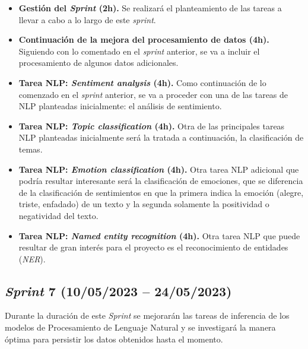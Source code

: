 \begin{itemize}

    \item \textbf{Gestión del \textit{Sprint} (2h).} Se realizará el planteamiento de las tareas a llevar a cabo a lo largo de este \textit{sprint}.

    \item \textbf{Continuación de la mejora del procesamiento de datos (4h).} Siguiendo con lo comentado en el \textit{sprint} anterior, se va a incluir el procesamiento de algunos datos adicionales.

    \item \textbf{Tarea NLP: \textit{Sentiment analysis} (4h).} Como continuación de lo comenzado en el \textit{sprint} anterior, se va a proceder con una de las tareas de NLP planteadas inicialmente: el análisis de sentimiento.

    \item \textbf{Tarea NLP: \textit{Topic classification} (4h).} Otra de las principales tareas NLP planteadas inicialmente será la tratada a continuación, la clasificación de temas.

    \item \textbf{Tarea NLP: \textit{Emotion classification} (4h).} Otra tarea NLP adicional que podría resultar interesante será la clasificación de emociones, que se diferencia de la clasificación de sentimientos en que la primera indica la emoción (alegre, triste, enfadado) de un texto y la segunda solamente la positividad o negatividad del texto.

    \item \textbf{Tarea NLP: \textit{Named entity recognition} (4h).} Otra tarea NLP que puede resultar de gran interés para el proyecto es el reconocimiento de entidades (\textit{NER}).

\end{itemize}

\subsection{\textit{Sprint} 7 (10/05/2023 -- 24/05/2023)}

Durante la duración de este \textit{Sprint} se mejorarán las tareas de inferencia de los modelos de Procesamiento de Lenguaje Natural y se investigará la manera óptima para persistir los datos obtenidos hasta el momento.


